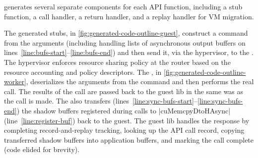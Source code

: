 {\CAvA generates several separate components for each API function, including a stub function, a call handler, a return handler, and a replay handler for VM migration.



The generated stubs, in \autoref{fig:generated-code-outline-guest}, construct a command from the arguments (including handling lists of asynchronous output buffers on lines~\ref{line:bufs-start}--\ref{line:bufs-end}) and then send it, via the hypervisor, to the \worker.
The hypervisor enforces resource sharing policy at the router based on the resource accounting and policy descriptors.
The \worker, in \autoref{fig:generated-code-outline-worker}, deserializes the arguments from the command and then performs the real call.
The results of the call are passed back to the guest lib in the same was as the call is made.
The \worker also transfers (lines~\ref{line:sync-bufs-start}--\ref{line:sync-bufs-end}) the shadow buffers registered during calls to \spec|cuMemcpyDtoHAsync| (line~\ref{line:register-buf}) back to the guest.
The guest lib handles the response by completing record-and-replay tracking, looking up the API call record, copying transferred shadow buffers into application buffers, and marking the call complete (code elided for brevity).

%

}
